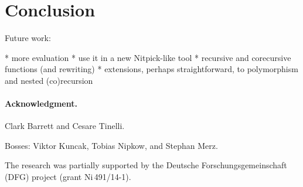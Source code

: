 \documentclass[a4paper,oribibl,envcountsame,draft]{llncs}
\begin{document}
\section{Conclusion}
\label{sec:conclusion}

Future work:

  * more evaluation
    * use it in a new Nitpick-like tool
  * recursive and corecursive functions
    (and rewriting)
  * extensions, perhaps straightforward, to polymorphism and nested
    (co)recursion

\def\ackname{Acknowledgment}
\paragraph{\ackname.}

Clark Barrett and Cesare Tinelli.

Bosses: Viktor Kuncak, Tobias Nipkow, and Stephan Merz.

The research was partially supported by the Deutsche
Forschungs\-gemein\-schaft (DFG) project
 (grant Ni\,491\slash 14-1).


{}
\end{document}
